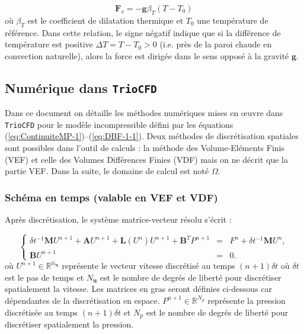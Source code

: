 \begin{equation}
\mathbf{F}_{v}=-\mathbf{g}\beta_{T}(T-T_{0})\label{eq:ApproxBoussinesq}
\end{equation}
o\`u $\beta_{T}$ est le coefficient de dilatation thermique et $T_{0}$
une temp\'erature de r\'ef\'erence. Dans cette relation, le signe n\'egatif
indique que si la diff\'erence de temp\'erature est positive $\Delta T=T-T_{0}>0$
(i.e. pr\`es de la paroi chaude en convection naturelle), alors la force
est dirig\'ee dans le sens oppos\'e \`a la gravit\'e $\mathbf{g}$.


\subsection{\label{sub:Num=0000E9rique-dans-TrioCFD}Num\'erique dans \texttt{TrioCFD}}

Dans ce document on d\'etaille les m\'ethodes num\'eriques mises en \oe uvre
dans \texttt{TrioCFD} pour le mod\`ele incompressible d\'efini par les
\'equations (\ref{eq:ContinuiteMP-1})--(\ref{eq:DBF-1-1}). Deux m\'ethodes
de discr\'etisation spatiales sont possibles dans l'outil de calculs
: la m\'ethode des Volume-El\'ements Finis (VEF) et celle des Volumes
Diff\'erences Finies (VDF) mais on ne d\'ecrit que la partie VEF. Dans
la suite, le domaine de calcul est not\'e $\Omega$.


\subsubsection{Sch\'ema en temps (valable en VEF et VDF)}

Apr\`es discr\'etisation, le syst\`eme matrice-vecteur r\'esolu s'\'ecrit :

\begin{equation}
\left\{ \begin{array}{rcl}
\delta t^{-1}\mathbf{M}U^{n+1}+\mathbf{A}U^{n+1}+\mathbf{L}(U^{n})U^{n+1}+\mathbf{B}^{T}P^{n+1} & = & F^{n}+\delta t^{-1}\mathbf{M}U^{n},\\
\mathbf{B}U^{n+1} & = & 0.
\end{array}\right.\label{eq:NavierStokes-dis-FV}
\end{equation}
o\`u $U^{n+1}\in\mathbb{R^{N_{\mathbf{u}}}}$ repr\'esente le vecteur
vitesse discr\'etis\'e au temps $(n+1)\delta t$ o\`u $\delta t$ est le
pas de temps et $N_{\mathbf{u}}$ est le nombre de degr\'es de libert\'e
pour discr\'etiser spatialement la vitesse. Les matrices en gras seront
d\'efinies ci-dessous car d\'ependantes de la discr\'etisation en espace.
$P^{n+1}\in\mathbb{R}^{N_{p}}$ repr\'esente la pression discr\'etis\'ee
au temps $(n+1)\delta t$ et $N_{p}$ est le nombre de degr\'es de libert\'e
pour discr\'etiser spatialement la pression.

